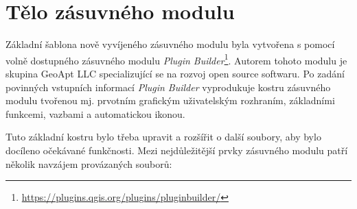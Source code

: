 \begin{enumerate}

\end{enumerate}

\section{Tělo zásuvného modulu}

Základní šablona nově vyvíjeného zásuvného modulu byla vytvořena s pomocí volně dostupného zásuvného modulu \textit{Plugin Builder}\footnote{\url{https://plugins.qgis.org/plugins/pluginbuilder/}}. Autorem tohoto modulu je skupina GeoApt LLC specializující se na rozvoj open source softwaru. Po zadání povinných vstupních informací \textit{Plugin Builder} vyprodukuje kostru zásuvného modulu tvořenou mj. prvotním grafickým uživatelským rozhraním, základními funkcemi, vazbami a automatickou ikonou.

Tuto základní kostru bylo třeba upravit a rozšířit o další soubory, aby bylo docíleno očekávané funkčnosti. Mezi nejdůležitější prvky zásuvného modulu patří několik navzájem provázaných souborů:

